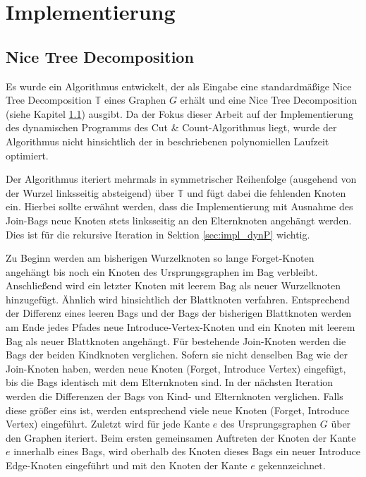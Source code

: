 %
%
%
\chapter{Implementierung}
\label{c:impl} %

\section{Nice Tree Decomposition}
\label{sec:impl_ntd}
Es wurde ein Algorithmus entwickelt, der als Eingabe eine standardmäßige Nice Tree Decomposition $\mathbb{T}$ eines Graphen $G$ erhält und eine Nice Tree Decomposition (siehe Kapitel \ref{sec:impl_ntd}) ausgibt. Da der Fokus dieser Arbeit auf der Implementierung des dynamischen Programms des Cut \& Count-Algorithmus liegt, wurde der Algorithmus nicht hinsichtlich der in \cite{kloks1994} beschriebenen polynomiellen Laufzeit optimiert. 

Der Algorithmus iteriert mehrmals in symmetrischer Reihenfolge (ausgehend von der Wurzel linksseitig absteigend) über $\mathbb{T}$ und fügt dabei die fehlenden Knoten ein. Hierbei sollte erwähnt werden, dass die Implementierung mit Ausnahme des \glqq Join\grqq -Bags neue Knoten stets linksseitig an den Elternknoten angehängt werden. Dies ist für die rekursive Iteration in Sektion \ref{sec:impl_dynP} wichtig.

Zu Beginn werden am bisherigen Wurzelknoten so lange \glqq Forget\grqq -Knoten angehängt bis noch ein Knoten des Ursprungsgraphen im Bag verbleibt. Anschließend wird ein letzter Knoten mit leerem Bag als neuer Wurzelknoten hinzugefügt. Ähnlich wird hinsichtlich der Blattknoten verfahren. Entsprechend der Differenz eines leeren Bags und der Bags der bisherigen Blattknoten werden am Ende jedes Pfades neue \glqq Introduce-Vertex\grqq -Knoten und ein Knoten mit leerem Bag als neuer Blattknoten angehängt. Für bestehende \glqq Join\grqq -Knoten werden die Bags der beiden Kindknoten verglichen. Sofern sie nicht denselben Bag wie der \glqq Join\grqq -Knoten haben, werden neue Knoten (\glqq Forget\grqq , \glqq Introduce Vertex\grqq ) eingefügt, bis die Bags identisch mit dem Elternknoten sind. 
In der nächsten Iteration werden die Differenzen der Bags von Kind- und Elternknoten verglichen. Falls diese größer eins ist, werden entsprechend viele neue Knoten (\glqq Forget\grqq , \glqq Introduce Vertex\grqq ) eingeführt.
Zuletzt wird für jede Kante $e$ des Ursprungsgraphen $G$ über den Graphen iteriert. Beim ersten gemeinsamen Auftreten der Knoten der Kante $e$ innerhalb eines Bags, wird oberhalb des Knoten dieses Bags ein neuer \glqq Introduce Edge\grqq -Knoten eingeführt und mit den Knoten der Kante $e$ gekennzeichnet.

